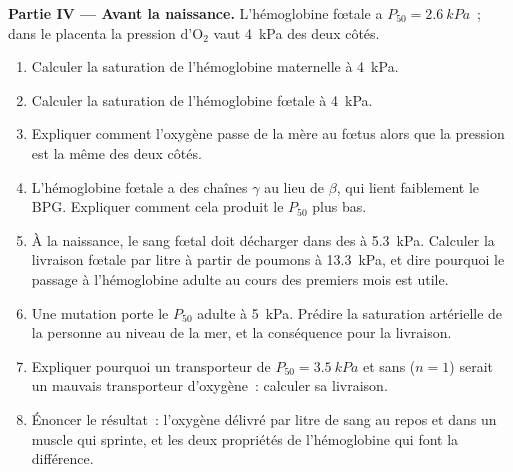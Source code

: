 \begin{problem}
\medskip
\noindent\textbf{Partie IV --- Avant la naissance.}
L'hémoglobine fœtale a $P_{50} = \qty{2.6}{kPa}$~; dans le placenta la
pression d'$\mathrm{O_2}$ vaut \qty{4}{kPa} des deux côtés.
\begin{enumerate}[resume]
  \item Calculer la saturation de l'hémoglobine maternelle à \qty{4}{kPa}.
  \item Calculer la saturation de l'hémoglobine fœtale à \qty{4}{kPa}.
  \item Expliquer comment l'oxygène passe de la mère au fœtus alors que
        la pression est la même des deux côtés.
  \item L'hémoglobine fœtale a des chaînes $\gamma$ au lieu de $\beta$,
        qui lient faiblement le BPG. Expliquer comment cela produit le
        $P_{50}$ plus bas.
  \item À la naissance, le sang fœtal doit décharger dans des  à
        \qty{5.3}{kPa}. Calculer la livraison fœtale par litre à partir
        de poumons à \qty{13.3}{kPa}, et dire pourquoi le passage à
        l'hémoglobine adulte au cours des premiers mois est utile.
  \item Une mutation porte le $P_{50}$ adulte à \qty{5}{kPa}. Prédire la
        saturation artérielle de la personne au niveau de la mer, et la
        conséquence pour la livraison.
  \item Expliquer pourquoi un transporteur de $P_{50} = \qty{3.5}{kPa}$
        et sans  ($n = 1$) serait un mauvais transporteur
        d'oxygène~: calculer sa livraison.
  \item Énoncer le résultat~: l'oxygène délivré par litre de sang au
        repos et dans un muscle qui sprinte, et les deux propriétés de
        l'hémoglobine qui font la différence.
\end{enumerate}
\end{problem}
